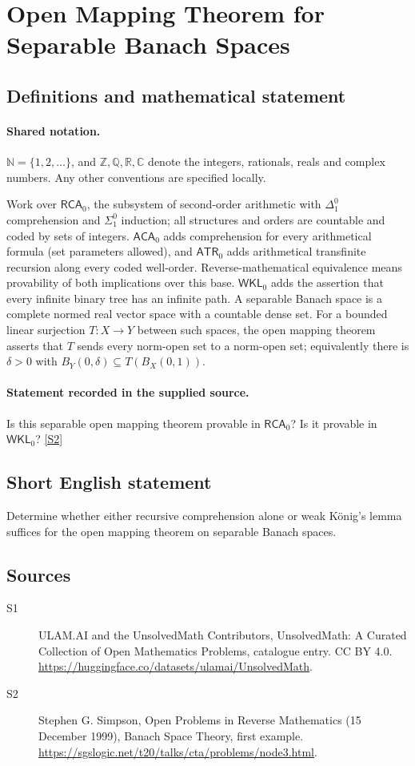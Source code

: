 \documentclass[11pt]{article}
\newcommand{\sref}[2]{\hyperlink{source:#1:#2}{[S#2]}}
\begin{document}
\section{Open Mapping Theorem for Separable Banach Spaces}\label{statement}

\subsection{Definitions and mathematical statement}

\paragraph{Shared notation.}$\mathbb N=\{1,2,\ldots\}$, and $\mathbb Z,\mathbb Q,\mathbb R,\mathbb C$ denote the integers, rationals, reals and complex numbers. Any other conventions are specified locally.


Work over $\mathsf{RCA}_0$, the subsystem of second-order arithmetic with $\Delta^0_1$ comprehension and $\Sigma^0_1$ induction; all structures and orders are countable and coded by sets of integers. $\mathsf{ACA}_0$ adds comprehension for every arithmetical formula (set parameters allowed), and $\mathsf{ATR}_0$ adds arithmetical transfinite recursion along every coded well-order. Reverse-mathematical equivalence means provability of both implications over this base. $\mathsf{WKL}_0$ adds the assertion that every infinite binary tree has an infinite path. A separable Banach space is a complete normed real vector space with a countable dense set. For a bounded linear surjection $T:X\to Y$ between such spaces, the open mapping theorem asserts that $T$ sends every norm-open set to a norm-open set; equivalently there is $\delta>0$ with $B_Y(0,\delta)\subseteq T(B_X(0,1))$.
\paragraph{Statement recorded in the supplied source.}
Is this separable open mapping theorem provable in $\mathsf{RCA}_0$? Is it provable in $\mathsf{WKL}_0$? \sref{statement}{2}
\subsection{Short English statement}
Determine whether either recursive comprehension alone or weak König's lemma suffices for the open mapping theorem on separable Banach spaces.
\subsection{Sources}
\begin{description}
\item[\hypertarget{source:statement:1}{S1}] ULAM.AI and the UnsolvedMath Contributors, UnsolvedMath: A Curated Collection of Open Mathematics Problems, catalogue entry. CC BY 4.0. \url{https://huggingface.co/datasets/ulamai/UnsolvedMath}.
\item[\hypertarget{source:statement:2}{S2}] Stephen G. Simpson, Open Problems in Reverse Mathematics (15 December 1999), Banach Space Theory, first example. \url{https://sgslogic.net/t20/talks/cta/problems/node3.html}.
\end{description}
\label{end:statement}
\end{document}
